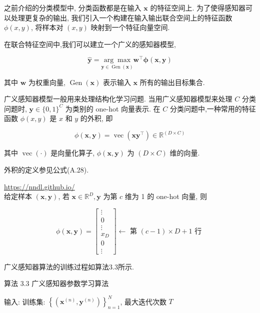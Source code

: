 \documentclass[10pt]{article}
\begin{document}
之前介绍的分类模型中, 分类函数都是在输入 $\boldsymbol{x}$ 的特征空间上. 为了使得感知器可以处理更复杂的输出, 我们引入一个构建在输入输出联合空间上的特征函数 $\phi(x, y)$, 将样本对 $(x, y)$ 映射到一个特征向量空间.

在联合特征空间中,我们可以建立一个广义的感知器模型,


\begin{equation*}
\hat{\boldsymbol{y}}=\underset{\boldsymbol{y} \in \operatorname{Gen}(\boldsymbol{x})}{\arg \max } \boldsymbol{w}^{\top} \boldsymbol{\phi}(\boldsymbol{x}, \boldsymbol{y}) \tag{3.78}
\end{equation*}


其中 $\boldsymbol{w}$ 为权重向量, $\operatorname{Gen}(\boldsymbol{x})$ 表示输入 $\boldsymbol{x}$ 所有的输出目标集合.

广义感知器模型一般用来处理结构化学习问题. 当用广义感知器模型来处理 $C$ 分类问题时, $\boldsymbol{y} \in\{0,1\}^{C}$ 为类别的 one-hot 向量表示. 在 $C$ 分类问题中,一种常用的特征函数 $\phi(x, y)$ 是 $x$ 和 $y$ 的外积, 即


\begin{equation*}
\phi(\boldsymbol{x}, \boldsymbol{y})=\operatorname{vec}\left(\boldsymbol{x} \boldsymbol{y}^{\top}\right) \in \mathbb{R}^{(D \times C)} \tag{3.79}
\end{equation*}


其中 $\operatorname{vec}(\cdot)$ 是向量化算子, $\phi(\boldsymbol{x}, \boldsymbol{y})$ 为 $(D \times C)$ 维的向量.

外积的定义参见公式(A.28).

\href{https://nndl.github.io/}{https://nndl.github.io/}\\
给定样本 $(\boldsymbol{x}, \boldsymbol{y})$, 若 $\boldsymbol{x} \in \mathbb{R}^{D}, \boldsymbol{y}$ 为第 $c$ 维为 1 的 one-hot 向量, 则

\[
\phi(\boldsymbol{x}, \boldsymbol{y})=\left[\begin{array}{c}
\vdots  \tag{3.80}\\
0 \\
\vdots \\
x_{D} \\
0 \\
\vdots
\end{array}\right] \leftarrow \text { 第 }(c-1) \times D+1 \text { 行 }
\]

广义感知器算法的训练过程如算法3.3所示.

算法 3.3 广义感知器参数学习算法

输入: 训练集: $\left\{\left(\boldsymbol{x}^{(n)}, \boldsymbol{y}^{(n)}\right)\right\}_{n=1}^{N}$, 最大迭代次数 $T$
\end{document}
